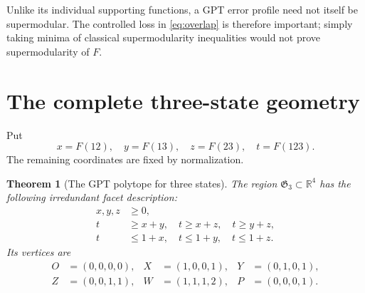 \documentclass[10pt,a4paper]{amsart}
\newtheorem{theorem}{Theorem}[section]
\newcommand{\R}{\mathbb R}
\newcommand{\1}{\mathbf 1}
\newcommand{\Greg}{\mathfrak G}
\begin{document}
Unlike its individual supporting functions, a GPT error profile need not itself
be supermodular. The controlled loss in \eqref{eq:overlap} is therefore
important; simply taking minima of classical supermodularity inequalities
would not prove supermodularity of $F$.

\section{The complete three-state geometry}\label{sec:three}

Put
\begin{equation}\label{eq:three-coordinates}
 x=F(12),\quad y=F(13),\quad z=F(23),\quad t=F(123).
\end{equation}
The remaining coordinates are fixed by normalization.


\begin{theorem}[The GPT polytope for three states]\label{thm:G3}
The region $\Greg_3\subset\R^4$ has the following irredundant facet description:
\begin{align}
 x,y,z&\ge0,\label{eq:G3-positive}\\
 t&\ge x+y,\quad t\ge x+z,\quad t\ge y+z,\label{eq:G3-lower}\\
 t&\le1+x,\quad t\le1+y,\quad t\le1+z.\label{eq:G3-upper}
\end{align}
Its vertices are
\begin{align*}
 O&=(0,0,0,0),& X&=(1,0,0,1),&Y&=(0,1,0,1),\\
 Z&=(0,0,1,1),& W&=(1,1,1,2),&P&=(0,0,0,1).
\end{align*}
\end{theorem}
\end{document}
